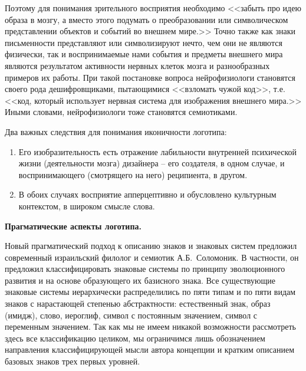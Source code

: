 Поэтому для понимания зрительного восприятия необходимо <<забыть про идею образа
в мозгу, а вместо этого подумать о преобразовании или символическом
представлении объектов и событий во внешнем мире.>> \autocite[][33-34]{velyanur2006}
Точно также как знаки письменности представляют или символизируют нечто,
чем они не являются физически, так и воспринимаемые нами события и предметы
внешнего мира являются результатом активности нервных клеток мозга и
разнообразных примеров их работы. При такой постановке вопроса нейрофизиологи
становятся своего рода дешифровщиками, пытающимися <<взломать чужой код>>,
т.е. <<код, который использует нервная система для изображения внешнего мира.>>\autocite[][34]{velyanur2006}
Иными словами, нейрофизиологи тоже становятся семиотиками.

Два важных следствия для понимания иконичности логотипа:
\begin{enumerate}
\item Его изобразительность есть отражение лабильности внутренней
  психической жизни (деятельности мозга) дизайнера -- его создателя, в одном
  случае, и воспринимающего (смотрящего на него) реципиента, в другом.
\item В обоих случаях восприятие апперцептивно и обусловлено культурным
  контекстом, в широком смысле слова.
\end{enumerate}

\textbf{Прагматические аспекты логотипа.}

Новый прагматический подход к описанию знаков и знаковых систем предложил
современный израильский филолог и семиотик А.Б.~Соломоник.
\autocite{solomonik1995}\autocite{solomonik2004}\autocite{solomonik2009}
В частности, он предложил классифицировать знаковые системы по принципу
эволюционного развития и на основе образующего их базисного знака.
Все существующие знаковые системы иерархически распределились по пяти типам и
по пяти видам знаков с нарастающей степенью абстрактности: естественный знак,
образ (имидж), слово, иероглиф, символ с постоянным значением, символ с
переменным значением.\autocite[][76-86]{solomonik2009} Так как мы не имеем
никакой возможности рассмотреть здесь все классификацию целиком, мы
ограничимся лишь обозначением направления классифицирующей мысли автора
концепции и кратким описанием  базовых знаков трех первых уровней.

